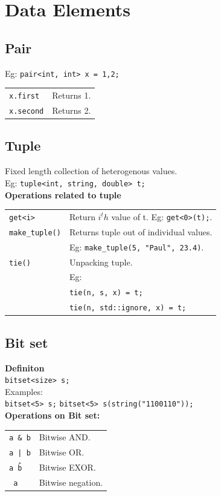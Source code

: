 \section{Data Elements}

\subsection{Pair}
Eg: \texttt{pair<int, int> x = {1,2};}\\
\begin{tabularx}{\linewidth}{lX}
\texttt{x.first} & Returns 1. \\
\texttt{x.second} & Returns 2.
\end{tabularx}

\subsection{Tuple}
Fixed length collection of heterogenous values.\\
Eg: \texttt{tuple<int, string, double> t;}\\

\textbf{Operations related to tuple}\\
\begin{tabularx}{\linewidth}{lX}
\texttt{get<i>} & Return $i^th$ value of t. Eg: \texttt{get<0>(t);}.\\
\texttt{make\_tuple()} & Returns tuple out of individual values.\\
& Eg: \texttt{make\_tuple(5, "Paul", 23.4)}.\\
\texttt{tie()} & Unpacking tuple.\\
& Eg: \\
& \texttt{tie(n, s, x) = t;}\\
& \texttt{tie(n, std::ignore, x) = t;}\\
\end{tabularx}

\subsection{Bit set}

\textbf{Definiton}\\
\texttt{bitset<size> s;}\\
Examples:\\
\texttt{bitset<5> s;}
\texttt{bitset<5> s(string("1100110"));}\\
\textbf{Operations on Bit set:}\\
\begin{tabularx}{\linewidth}{lX}
\texttt{a \& b} & Bitwise AND.\\
\texttt{a | b} & Bitwise OR.\\
\texttt{a \^ b} & Bitwise EXOR.\\
\texttt{~a} & Bitwise negation.\\
\end{tabularx}
